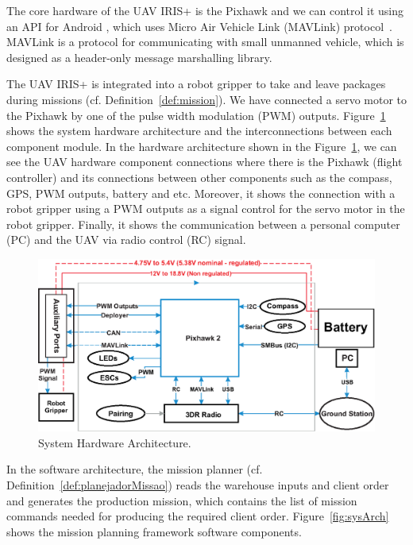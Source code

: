 \documentclass[12pt]{article}
\begin{document}
The core hardware of the UAV IRIS+ is the Pixhawk and we can control it using an API for Android \cite{dronekit}, which uses Micro Air Vehicle Link (MAVLink) protocol~\cite{meier2011pixhawk}. MAVLink is a protocol for communicating with small unmanned vehicle, which is designed as a header-only message marshalling library.

The UAV IRIS+ is integrated into a robot gripper to take and leave packages during missions (cf. Definition~\ref{def:mission}). We have connected a servo motor to the Pixhawk by one of the pulse width modulation (PWM) outputs. Figure~\ref{fig:hardArch} shows the system hardware architecture and the interconnections between each component module. In the hardware architecture shown in the Figure~\ref{fig:hardArch}, we can see the UAV hardware component connections where there is the Pixhawk (flight controller) and its connections between other components such as the compass, GPS, PWM outputs, battery and etc. Moreover, it shows the connection with a robot gripper using a PWM outputs as a signal control for the servo motor in the robot gripper. Finally, it shows the communication between a personal computer (PC) and the UAV via radio control (RC) signal.
%
\begin{figure}[H]
	\centering
	\includegraphics[width=\columnwidth]{arquiteturaIHW.eps}
	\caption{System Hardware Architecture.}
	\label{fig:hardArch}
\end{figure}

In the software architecture, the mission planner (cf. Definition~\ref{def:planejadorMissao}) reads the warehouse inputs and client order and generates the production mission, which contains the list of mission commands needed for producing the required client order. Figure~\ref{fig:sysArch} shows the mission planning framework software components.
\end{document}
